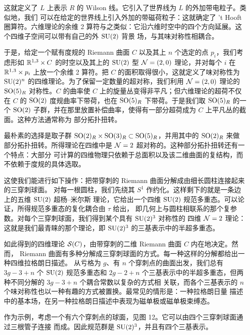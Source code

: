 
这就定义了 $L$ 上表示 $R$ 的 Wilson 线。它引入了世界线为 $L$ 的外加带电粒子。类似地，我们
可以在给定的世界线上引入外加的带磁荷粒子：这就确定了 't Hooft 圈算符。六维理论的余维 2
算符与之类似：它沿六维时空中的四个方向延展。这个四维子空间可以带有自己的外 $\mathrm{SU}(2)$ 背景
场，与其味对称性相耦合。

于是，给定一个赋有度规的 Riemann 曲面 $C$ 以及其上 $n$ 个选定的点 $p_i$，我们考虑形如
$\mathbb{R}^{1,3}\times C$ 的时空以及其上的 $\mathrm{SU}(2)$ 型 $\mathcal{N}=(2,0)$ 理论，并对每个 $i$ 在
$\mathbb{R}^{1,3}\times p_i$ 上放一个余维 2 算符。把 $C$ 的面积取得很小，这就定义了味对称性为
$\mathrm{SU}(2)^n$ 的四维理论。为了保留一定数量的超对称，我们利用 $\mathcal{N}=(2,0)$ 理论的
$\mathrm{SO}(5)_R$ 对称性。$C$ 的曲率使 $C$ 上的旋量丛变得非平凡；但六维理论的超荷不仅在 $C$ 的
$\mathrm{SO}(2)$ 度规曲率下带荷，也在 $\mathrm{SO}(5)_R$ 下带荷。于是我们取 $\mathrm{SO}(5)_R$ 的一个 $\mathrm{SO}(2)$
子群，并在那里放置补偿曲率，使得有一部分超荷成为 $C$ 上平凡丛的截面。这种方法通常称为
部分拓扑扭转。


最朴素的选择是取子群 $\mathrm{SO}(2)_R\times\mathrm{SO}(3)_R\subset\mathrm{SO}(5)_R$，并用其中的 $\mathrm{SO}(2)_R$ 来做
部分拓扑扭转。所得理论在四维中是 $\mathcal{N}=2$ 超对称的。这种部分拓扑扭转还有一个特点：大部分
可计算的四维物理只依赖于总面积以及该二维曲面的复结构，而不依赖于度规的具体选取。

这使我们能进行如下操作：把带穿刺的 Riemann 曲面分解成由细长圆柱连接起来的三穿刺球面。
对每一根圆柱，我们先绕其 $S^1$ 作约化。这样剩下的就是一条边上的五维 $\mathrm{SU}(2)$ 超杨--米尔斯
理论，它给出一个四维 $\mathrm{SU}(2)$ 规范多重态。可以论证，所得规范多重态的复化耦合由 $\tau$ 给出，
即几何上与圆柱相联系的那个复参数。对每个三穿刺球面，我们得到某个具有 $\mathrm{SU}(2)^3$ 对称性的
四维 $\mathcal{N}=2$ 理论：这就是我们最青睐的那个理论，即 $\mathrm{SU}(2)^3$ 的三基表示中的半超多重态。

如此得到的四维理论 $\mathcal{S}(C)$，由带穿刺的二维 Riemann 曲面 $C$ 内在地决定。然而，
Riemann 曲面有多种分解成三穿刺球面的方式。每一种这样的分解都给出一种四维拉格朗日描述。
从亏格为 $g$、有 $n$ 个穿刺点的曲面出发，我们总有 $3g-3+n$ 个 $\mathrm{SU}(2)$ 规范多重态和
$2g-2+n$ 个三基表示中的半超多重态，但两种不同分解的 $3g-3+n$ 个耦合常数以复杂的方式相
关联，而各个三基表示的 $n$ 个味对称性也以一种有趣的方式被置换。最常见的情形是：一种拉格朗日量
描述中的基本场，在另一种拉格朗日描述中表现为磁单极或磁单极束缚态。


作为示例，考虑一个有六个穿刺点的球面，见图 12。它可以由四个三穿刺球面通过三根管子连接
而成。因此规范群是 $\mathrm{SU}(2)^3$，并且有四个三基表示。
